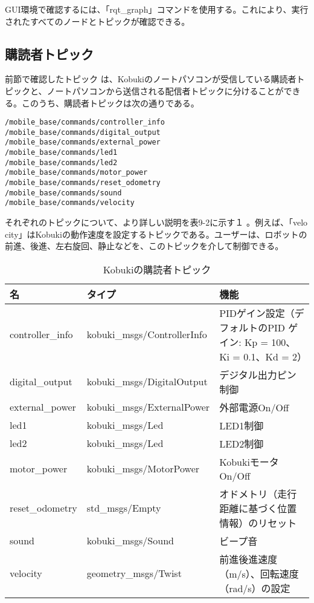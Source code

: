 GUI環境で確認するには、「rqt\_graph」コマンドを使用する。これにより、実行されたすべてのノードとトピックが確認できる。

\subsection{購読者トピック}

前節で確認したトピック  は、Kobukiのノートパソコンが受信している購読者トピックと、ノートパソコンから送信される配信者トピックに分けることができる。このうち、購読者トピックは次の通りである。

\begin{lstlisting}[language=ROS]
/mobile_base/commands/controller_info
/mobile_base/commands/digital_output
/mobile_base/commands/external_power
/mobile_base/commands/led1
/mobile_base/commands/led2
/mobile_base/commands/motor_power
/mobile_base/commands/reset_odometry
/mobile_base/commands/sound
/mobile_base/commands/velocity
\end{lstlisting}

それぞれのトピックについて、より詳しい説明を表9-2に示す１ 。例えば、「velo\\city」はKobukiの動作速度を設定するトピックである。ユーザーは、ロボットの前進、後進、左右旋回、静止などを、このトピックを介して制御できる。

\begin{table}[htp]
\centering
\small
\begin{tabular}{p{2cm} p{5cm} p{5cm}}
\toprule
\textbf{名} & \textbf{タイプ} & \textbf{機能}\\
\midrule
controller\_info & kobuki\_msgs/ControllerInfo  &  PIDゲイン設定（デフォルトのPID ゲイン: Kp = 100、Ki = 0.1、Kd = 2） \\
digital\_output  & kobuki\_msgs/DigitalOutput & デジタル出力ピン制御 \\
external\_power  & kobuki\_msgs/ExternalPower & 外部電源On/Off \\
led1 & kobuki\_msgs/Led & LED1制御 \\
led2  & kobuki\_msgs/Led & LED2制御 \\
motor\_power & kobuki\_msgs/MotorPower  & KobukiモータOn/Off \\
reset\_odometry  & std\_msgs/Empty  & オドメトリ（走行距離に基づく位置情報）のリセット \\
sound & kobuki\_msgs/Sound & ビープ音 \\
velocity  & geometry\_msgs/Twist & 前進後進速度（m/s）、回転速度（rad/s）の設定 \\
\bottomrule
\end{tabular}
\caption{Kobukiの購読者トピック}
\end{table}

